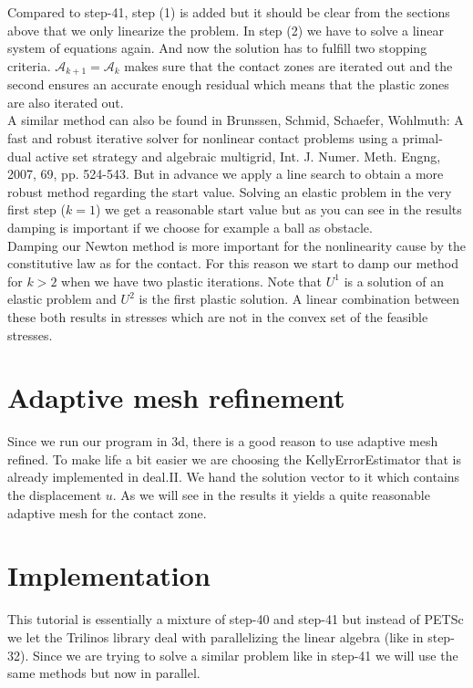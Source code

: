 \documentclass{article}
\begin{document}
Compared to step-41, step (1) is added but it should be clear from the sections
above that we only linearize the problem. In step (2) we have to solve a linear system of equations again. And now the solution has to fulfill two stopping
criteria. $\mathcal{A}_{k+1} = \mathcal{A}_k$ makes sure that the contact zones
are iterated out and the second ensures an accurate enough residual which means that the plastic zones are also iterated out.\\
A similar method can also be found in Brunssen, Schmid, Schaefer, Wohlmuth: A
fast and robust iterative solver for nonlinear contact problems using a
primal-dual active set strategy and algebraic multigrid, Int. J. Numer.
Meth. Engng, 2007, 69, pp. 524-543. But in advance we apply a line search to
obtain a more robust method regarding the start value. Solving an elastic
problem in the very first step ($k=1$) we get a reasonable start value but as
you can see in the results damping is important if we choose for example a ball as
obstacle.\\
Damping our Newton method is more important for the nonlinearity cause by the
constitutive law as for the contact. For this reason we start to damp our method
for $k>2$ when we have two plastic iterations. Note that $U^1$ is a solution of
an elastic problem and $U^2$ is the first plastic solution. A linear combination
between these both results in stresses which are not in the convex set
of the feasible stresses.

\section{Adaptive mesh refinement}

Since we run our program in 3d, there is a good reason to use adaptive
mesh refined. To make life a bit easier we are choosing the
KellyErrorEstimator that is already implemented in deal.II. We hand the
solution vector to it which contains the displacement $u$. As we will see in the
results it yields a quite reasonable adaptive mesh for the contact zone.

\section{Implementation}

This tutorial is essentially a mixture of step-40 and step-41 but instead of
PETSc we let the Trilinos library deal with parallelizing the linear algebra
(like in step-32). Since we are trying to solve a similar problem like in
step-41 we will use the same methods but now in parallel.
\end{document}
